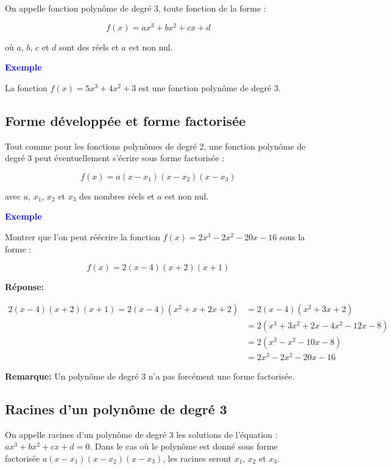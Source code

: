 \documentclass[a4paper,12pt]{article}
\begin{document}
On appelle fonction polynôme de degré 3, toute fonction de la forme :

\[
f(x) = ax^3 + bx^2 + cx + d
\]

où $a$, $b$, $c$ et $d$ sont des réels et $a$ est non nul.

\vspace{1em}
\textbf{\textcolor{blue}{Exemple}} \par

La fonction $f(x) = 5x^3 + 4x^2 + 3$ est une fonction polynôme de degré 3.

\subsection*{Forme développée et forme factorisée}

Tout comme pour les fonctions polynômes de degré 2, une fonction polynôme de degré 3 peut éventuellement s'écrire sous forme factorisée :

\[
f(x) = a(x - x_1)(x - x_2)(x - x_3)
\]

avec $a$, $x_1$, $x_2$ et $x_3$ des nombres réels et $a$ est non nul.

\vspace{1em}

\textbf{\textcolor{blue}{Exemple}} \par

Montrer que l’on peut réécrire la fonction $f(x) = 2x^3 - 2x^2 - 20x - 16$ sous la forme :

\[
f(x) = 2(x - 4)(x + 2)(x + 1)
\]

\textbf{Réponse:}

\begin{align}
  2(x - 4)(x + 2)(x + 1) = 2(x - 4)(x^2 + x + 2x + 2) &= 2(x - 4)(x^2 + 3x + 2) \\
  &= 2(x^3 + 3x^2 + 2x - 4x^2 - 12x - 8) \\
  &= 2(x^3 - x^2 - 10x - 8) \\
  &= 2x^3 - 2x^2 - 20x - 16
\end{align}

\textbf{Remarque:} Un polynôme de degré 3 n’a pas forcément une forme factorisée.

\subsection*{Racines d’un polynôme de degré 3}

On appelle racines d’un polynôme de degré 3 les solutions de l’équation : $ax^3 + bx^2 + cx + d = 0$. Dans le cas où le polynôme est donné sous forme factorisée $a(x - x_1)(x - x_2)(x - x_3)$, les racines seront $x_1$, $x_2$ et $x_3$.
\end{document}
